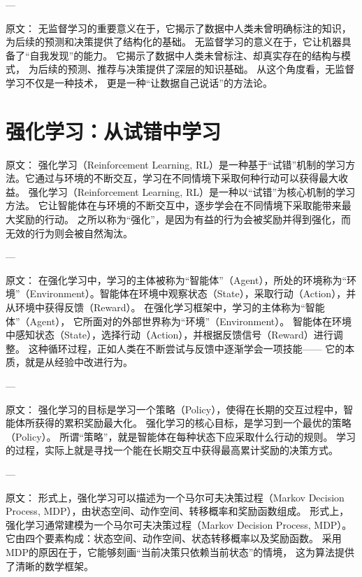 ---

原文：
无监督学习的重要意义在于，它揭示了数据中人类未曾明确标注的知识，为后续的预测和决策提供了结构化的基础。
无监督学习的意义在于，它让机器具备了“自我发现”的能力。  
它揭示了数据中人类未曾标注、却真实存在的结构与模式，  
为后续的预测、推荐与决策提供了深层的知识基础。  
从这个角度看，无监督学习不仅是一种技术，  
更是一种“让数据自己说话”的方法论。

\section{强化学习：从试错中学习}

原文：
强化学习（Reinforcement Learning, RL）是一种基于“试错”机制的学习方法。它通过与环境的不断交互，学习在不同情境下采取何种行动可以获得最大收益。
强化学习（Reinforcement Learning, RL）是一种以“试错”为核心机制的学习方法。  
它让智能体在与环境的不断交互中，逐步学会在不同情境下采取能带来最大奖励的行动。  
之所以称为“强化”，是因为有益的行为会被奖励并得到强化，而无效的行为则会被自然淘汰。

---

原文：
在强化学习中，学习的主体被称为“智能体”（Agent），所处的环境称为“环境”（Environment）。智能体在环境中观察状态（State），采取行动（Action），并从环境中获得反馈（Reward）。
在强化学习框架中，学习的主体称为“智能体”（Agent），  
它所面对的外部世界称为“环境”（Environment）。  
智能体在环境中感知状态（State），选择行动（Action），并根据反馈信号（Reward）进行调整。  
这种循环过程，正如人类在不断尝试与反馈中逐渐学会一项技能——  
它的本质，就是从经验中改进行为。

---

原文：
强化学习的目标是学习一个策略（Policy），使得在长期的交互过程中，智能体所获得的累积奖励最大化。
强化学习的核心目标，是学习到一个最优的策略（Policy）。  
所谓“策略”，就是智能体在每种状态下应采取什么行动的规则。  
学习的过程，实际上就是寻找一个能在长期交互中获得最高累计奖励的决策方式。

---

原文：
形式上，强化学习可以描述为一个马尔可夫决策过程（Markov Decision Process, MDP），由状态空间、动作空间、转移概率和奖励函数组成。
形式上，强化学习通常建模为一个马尔可夫决策过程（Markov Decision Process, MDP）。  
它由四个要素构成：状态空间、动作空间、状态转移概率以及奖励函数。  
采用MDP的原因在于，它能够刻画“当前决策只依赖当前状态”的情境，  
这为算法提供了清晰的数学框架。

